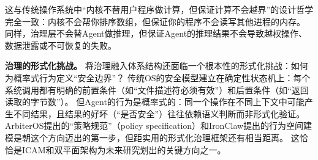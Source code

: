 这与传统操作系统中``内核不替用户程序做计算，但保证计算不会越界''的设计哲学完全一致\cite{ostep_2023}：内核不会帮你排序数组，但保证你的程序不会读写其他进程的内存。
同样，治理层不会替Agent做推理，但保证Agent的推理结果不会导致越权操作、数据泄露或不可恢复的失败。

\textbf{治理的形式化挑战。}
将治理融入体系结构还面临一个根本性的形式化挑战：如何为概率式行为定义``安全边界''？
传统OS的安全模型建立在确定性状态机上：每个系统调用都有明确的前置条件（如``文件描述符必须有效''）和后置条件（如``返回读取的字节数''）。
但Agent的行为是概率式的：同一个操作在不同上下文中可能产生不同结果，且结果的好坏（``是否安全''）往往依赖语义判断而非形式化验证。
ArbiterOS\cite{arbiteros2025}提出的``策略规范''（policy specification）和IronClaw\cite{ironclaw2025}提出的行为空间建模是朝这个方向迈出的第一步，但距实用的形式化治理框架还有相当距离。
这恰恰是ICAM和双平面架构为未来研究划出的关键方向之一。